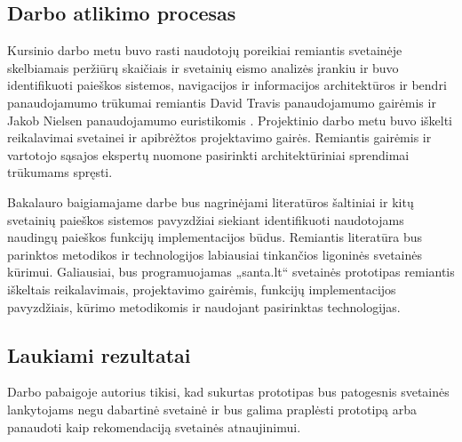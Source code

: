 \documentclass{VUMIFPSkursinis}
\begin{document}
\subsection*{Darbo atlikimo procesas}
Kursinio darbo \cite{Kursinis} metu buvo rasti naudotojų poreikiai remiantis svetainėje skelbiamais peržiūrų skaičiais \cite{VulSkApieMusLt, VulSkKaipMusRastiLt} ir svetainių eismo analizės įrankiu \cite{AlexaSantaEn} ir buvo identifikuoti paieškos sistemos, navigacijos ir informacijos architektūros ir bendri panaudojamumo trūkumai remiantis David Travis panaudojamumo gairėmis \cite{SearchGuidelinesEn, NavigationAndIAGuidelinesEn} ir Jakob Nielsen panaudojamumo euristikomis \cite{NielsenHeuristicsEn}. Projektinio darbo \cite{Projektinis} metu buvo iškelti reikalavimai svetainei ir apibrėžtos projektavimo gairės. Remiantis gairėmis ir vartotojo sąsajos ekspertų nuomone \cite{TopVsLeftNav, TopVsLeftNav2, LeftNav} pasirinkti architektūriniai sprendimai trūkumams spręsti.

Bakalauro baigiamajame darbe bus nagrinėjami literatūros šaltiniai ir kitų svetainių paieškos sistemos pavyzdžiai siekiant identifikuoti naudotojams naudingų paieškos funkcijų implementacijos būdus. Remiantis literatūra bus parinktos metodikos ir technologijos labiausiai tinkančios ligoninės svetainės kūrimui. Galiausiai, bus programuojamas „santa.lt“ svetainės prototipas remiantis iškeltais reikalavimais, projektavimo gairėmis, funkcijų implementacijos pavyzdžiais, kūrimo metodikomis ir naudojant pasirinktas technologijas.

\subsection*{Laukiami rezultatai}
Darbo pabaigoje autorius tikisi, kad sukurtas prototipas bus patogesnis svetainės lankytojams negu dabartinė svetainė ir bus galima praplėsti prototipą arba panaudoti kaip rekomendaciją svetainės atnaujinimui.








\printbibliography[heading=bibintoc, title=Šaltiniai]  %
\end{document}
